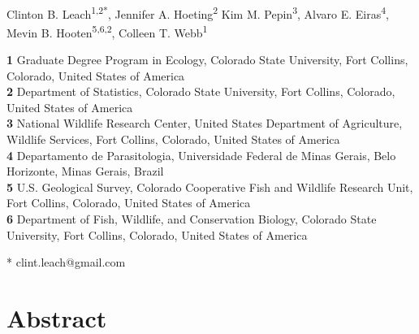 \documentclass[10pt,letterpaper]{article}
\date{}
\begin{document}
\vspace*{0.2in}

\begin{flushleft}
{\Large
\textbf{}
}
\newline
\\
Clinton B. Leach\textsuperscript{1,2*},
Jennifer A. Hoeting\textsuperscript{2}
Kim M. Pepin\textsuperscript{3},
Alvaro E. Eiras\textsuperscript{4},
Mevin B. Hooten\textsuperscript{5,6,2},
Colleen T. Webb\textsuperscript{1}


\bigskip
\textbf{1} Graduate Degree Program in Ecology, Colorado State University, Fort Collins, Colorado, United States of America
\\
\textbf{2} Department of Statistics, Colorado State University, Fort Collins, Colorado, United States of America
\\
\textbf{3} National Wildlife Research Center, United States Department of Agriculture, Wildlife Services, Fort Collins, Colorado, United States of America
\\
\textbf{4} Departamento de Parasitologia, Universidade Federal de Minas Gerais, Belo Horizonte, Minas Gerais, Brazil
\\
\textbf{5} U.S. Geological Survey, Colorado Cooperative Fish and Wildlife Research Unit, Fort Collins, Colorado, United States of America
\\
\textbf{6} Department of Fish, Wildlife, and Conservation Biology, Colorado State University, Fort Collins, Colorado, United States of America
\bigskip

% 


* clint.leach@gmail.com

\end{flushleft}
\section*{Abstract}
\end{document}
